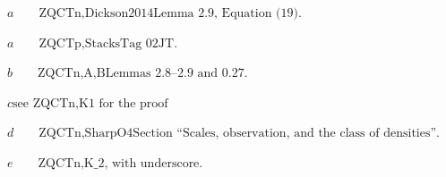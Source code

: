 \documentclass{article}
\begin{document}
$ a \qquad\text{ZQCTn,Dickson2014}\text{Lemma~2.9, Equation~(19)}. $

$ a \qquad\text{ZQCTp,Stacks}\text{Tag~02JT}. $

$ b \qquad\text{ZQCTn,A,B}\text{Lemmas~2.8--2.9 and~0.27}. $

$ c \text{see }\text{ZQCTn,K1}\text{ for the proof} $

$ d \qquad\text{ZQCTn,SharpO4}\text{Section ``Scales, observation, and the class of densities''}. $

$ e \qquad\text{ZQCTn,K_2, with underscore}. $
\end{document}
